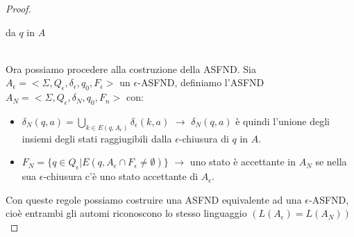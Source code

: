 \begin{proof}
{{\begin{definition}
   da $q$ in $A$
\end{definition}}} \medskip\\
\noindent Ora possiamo procedere alla costruzione della ASFND. Sia $A_\epsilon = < \Sigma, Q_{\epsilon}, \delta_\epsilon,q_0,F_\epsilon  >$
un $\epsilon$-ASFND, definiamo l'ASFND $A_N = < \Sigma, Q_\epsilon, \delta_N, q_0, F_n  >$ con:
\begin{itemize}
    \item $\delta_N(q,a) = \bigcup_{k \in E(q,A_\epsilon)} \delta_\epsilon(k,a)$ $\longrightarrow$ $\delta_N(q,a)$
    è quindi l'unione degli insiemi degli stati raggiugibili dalla $\epsilon$-chiusura di $q$ in $A$.
    \item $F_N = \{ q \in Q_\epsilon | E(q,A_\epsilon \cap F_\epsilon \neq \emptyset)   \}$  $\longrightarrow$ 
    uno stato è accettante in $A_N$ se nella sua $\epsilon$-chiusura c'è uno stato accettante di $A_\epsilon$.
\end{itemize}
Con queste regole possiamo costruire una ASFND equivalente ad una $\epsilon$-ASFND, cioè entrambi gli automi riconoscono 
lo stesso linguaggio $(L(A_\epsilon) = L(A_N))$ 
\end{proof}


\newpage




